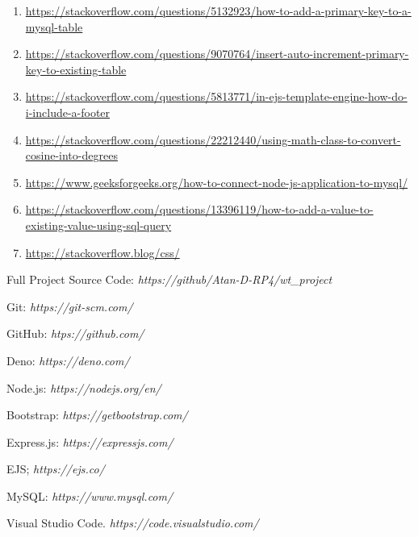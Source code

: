 \begin{enumerate}
    \item \raggedright \url{https://stackoverflow.com/questions/5132923/how-to-add-a-primary-key-to-a-mysql-table}
    \item \raggedright \url{https://stackoverflow.com/questions/9070764/insert-auto-increment-primary-key-to-existing-table}
    \item \raggedright \url{https://stackoverflow.com/questions/5813771/in-ejs-template-engine-how-do-i-include-a-footer}
    \item \raggedright \url{https://stackoverflow.com/questions/22212440/using-math-class-to-convert-cosine-into-degrees}
    \item \raggedright \url{https://www.geeksforgeeks.org/how-to-connect-node-js-application-to-mysql/}
    \item \raggedright \url{https://stackoverflow.com/questions/13396119/how-to-add-a-value-to-existing-value-using-sql-query}
    \item \raggedright \url{https://stackoverflow.blog/css/}
\end{enumerate}

\begin{thebibliography}{9}
    Full Project Source Code: \textit{https://github/Atan-D-RP4/wt\_project}

    Git: \textit{https://git-scm.com/}

    GitHub: \textit{htps://github.com/}

    Deno: \textit{https://deno.com/}

    Node.js: \textit{https://nodejs.org/en/}

    Bootstrap: \textit{https://getbootstrap.com/}

    Express.js: \textit{https://expressjs.com/}

    EJS; \textit{https://ejs.co/}

    MySQL: \textit{https://www.mysql.com/}

    Visual Studio Code. \textit{https://code.visualstudio.com/}
\end{thebibliography}
